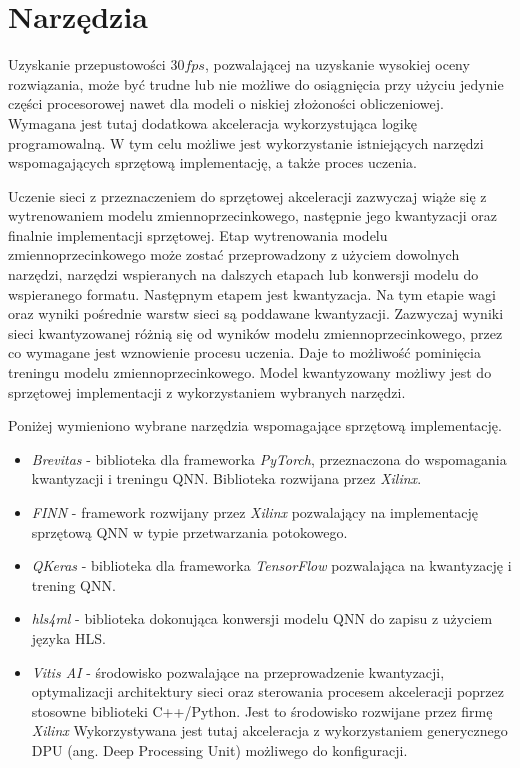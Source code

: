 \section{Narzędzia}
Uzyskanie przepustowości $30 fps$, pozwalającej na uzyskanie wysokiej oceny rozwiązania, może być trudne lub nie możliwe do osiągnięcia przy użyciu jedynie części procesorowej nawet dla modeli o niskiej złożoności obliczeniowej. 
Wymagana jest tutaj dodatkowa akceleracja wykorzystująca logikę programowalną. 
W tym celu możliwe jest wykorzystanie istniejących narzędzi wspomagających sprzętową implementację, a także proces uczenia. 

Uczenie sieci z przeznaczeniem do sprzętowej akceleracji zazwyczaj wiąże się z wytrenowaniem modelu zmiennoprzecinkowego, następnie jego kwantyzacji oraz finalnie implementacji sprzętowej.
Etap wytrenowania modelu zmiennoprzecinkowego może zostać przeprowadzony z użyciem dowolnych narzędzi, narzędzi wspieranych na dalszych etapach lub konwersji modelu do wspieranego formatu. 
Następnym etapem jest kwantyzacja. Na tym etapie wagi oraz wyniki pośrednie warstw sieci są poddawane kwantyzacji. 
Zazwyczaj wyniki sieci kwantyzowanej różnią się od wyników modelu zmiennoprzecinkowego, przez co wymagane jest wznowienie procesu uczenia.
Daje to możliwość pominięcia treningu modelu zmiennoprzecinkowego.
Model kwantyzowany możliwy jest do sprzętowej implementacji z wykorzystaniem wybranych narzędzi.

Poniżej wymieniono wybrane narzędzia wspomagające sprzętową implementację. 
\begin{itemize}
    \item \emph{Brevitas}\cite{brevitas} - biblioteka dla frameworka \emph{PyTorch}\cite{pytorch}, przeznaczona do wspomagania kwantyzacji i treningu QNN. Biblioteka rozwijana przez \emph{Xilinx}.
    
    \item \emph{FINN}\cite{finn} - framework rozwijany przez \emph{Xilinx} pozwalający na implementację sprzętową QNN w typie przetwarzania potokowego.
    
    \item \emph{QKeras}\cite{qkeras} - biblioteka dla frameworka \emph{TensorFlow}\cite{tf} pozwalająca na kwantyzację i trening QNN.
    \item \emph{hls4ml}\cite{hls4ml} - biblioteka dokonująca konwersji modelu QNN do zapisu z użyciem języka HLS. 
    
    \item \emph{Vitis AI}\cite{vitis_ai} - środowisko pozwalające na przeprowadzenie kwantyzacji, optymalizacji architektury sieci oraz sterowania procesem akceleracji poprzez stosowne biblioteki C++/Python. Jest to środowisko rozwijane przez firmę \emph{Xilinx}
    Wykorzystywana jest tutaj akceleracja z wykorzystaniem generycznego  DPU (ang. Deep Processing Unit) możliwego do konfiguracji.
    
\end{itemize}


